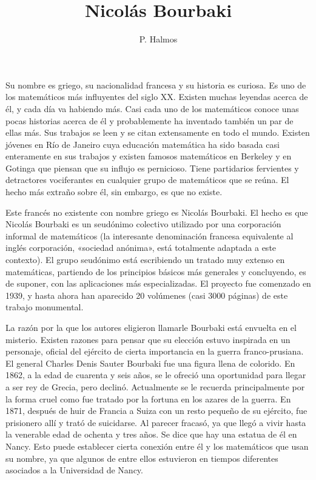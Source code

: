 \documentclass[a4paper, 12pt]{article}
\title{Nicolás Bourbaki}
\author{P. Halmos}
\date{}
\begin{document}
\begin{tcolorbox}[colback=blue!5!white,colframe=blue!75!black]

\vspace{-1.8cm}
\textbf \maketitle

\end{tcolorbox}

\bigskip


Su nombre es griego, su nacionalidad francesa y su historia es curiosa. 
Es uno de los matemáticos más influyentes del siglo XX. Existen 
muchas leyendas acerca de él, y cada día va habiendo más. Casi 
cada uno de los matemáticos conoce unas pocas historias acerca de 
él y probablemente ha inventado también un par de ellas más. Sus 
trabajos se leen y se citan extensamente en todo el mundo. Existen 
jóvenes en Río de Janeiro cuya educación matemática ha sido 
basada casi enteramente en sus trabajos y existen famosos matemáticos en 
Berkeley y en Gotinga que piensan que su influjo es pernicioso. Tiene 
partidarios fervientes y detractores vociferantes en cualquier grupo de 
matemáticos que se reúna. El hecho más extraño sobre él, 
sin embargo, es que no existe. 

Este francés no existente con nombre griego es Nicolás 
Bourbaki. El hecho es que Nicolás Bourbaki es un seudónimo colectivo 
utilizado por una corporación informal de matemáticos (la 
interesante denominación francesa equivalente al inglés 
corporación, «sociedad anónima», está totalmente adaptada a este 
contexto). El grupo seudónimo está escribiendo un tratado muy 
extenso en matemáticas, partiendo de los principios básicos más 
generales y concluyendo, es de suponer, con las aplicaciones más 
especializadas. El proyecto fue comenzado en 1939, y hasta ahora han 
aparecido 20 volúmenes (casi 3000 páginas) de este trabajo 
monumental. 

La razón por la que los autores eligieron llamarle Bourbaki 
está envuelta en el misterio. Existen razones para pensar que su 
elección estuvo inspirada en un personaje, oficial del ejército de 
cierta importancia en la guerra franco-prusiana. El general Charles Denis 
Sauter Bourbaki fue una figura llena de colorido. En 1862, a la edad de 
cuarenta y seis años, se le ofreció una oportunidad para llegar a 
ser rey de Grecia, pero declinó. Actualmente se le recuerda 
principalmente por la forma cruel como fue tratado por la fortuna en los 
azares de la guerra. En 1871, después de huir de Francia a Suiza con un 
resto pequeño de su ejército, fue prisionero allí y trató 
de suicidarse. Al parecer fracasó, ya que llegó a vivir hasta la 
venerable edad de ochenta y tres años. Se dice que hay una estatua de 
él en Nancy. Esto puede establecer cierta conexión entre él y 
los matemáticos que usan su nombre, ya que algunos de entre ellos 
estuvieron en tiempos diferentes asociados a la Universidad de Nancy. 
\end{document}
